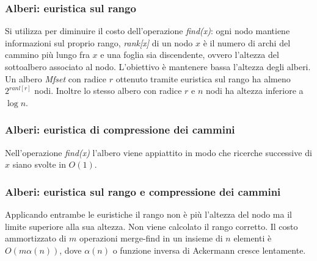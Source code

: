 \subsubsection{Alberi: euristica sul rango}
Si utilizza per diminuire il costo dell'operazione \emph{find(x)}: ogni nodo mantiene informazioni sul proprio rango, \emph{rank[x]} di un nodo $x$ \`e il numero di archi del cammino pi\`u lungo fra $x$ e una 
foglia sia discendente, ovvero l'altezza del sottoalbero associato al nodo. L'obiettivo \`e mantenere bassa l'altezza degli alberi. Un albero \emph{Mfset} con radice $r$ ottenuto tramite euristica sul
rango ha almeno $2^{ranl[r]}$ nodi. Inoltre lo stesso albero con radice $r$ e $n$ nodi ha altezza inferiore a $\log n$. 
\begin{multicols}{2}

\columnbreak

\end{multicols}
\subsubsection{Alberi: euristica di compressione dei cammini}
\begin{multicols}{2}
Nell'operazione \emph{find(x)} l'albero viene appiattito in modo che ricerche successive di $x$ siano svolte in $O(1)$.

\end{multicols}
\subsubsection{Alberi: euristica sul rango e compressione dei cammini}
Applicando entrambe le euristiche il rango non \`e pi\`u l'altezza del nodo ma il limite superiore alla sua altezza. Non viene calcolato il rango corretto. Il costo ammortizzato di $m$ operazioni merge-find in un 
insieme di $n$ elementi \`e $O(m\alpha(n))$, dove $\alpha(n)$ o funzione inversa di Ackermann cresce lentamente. 